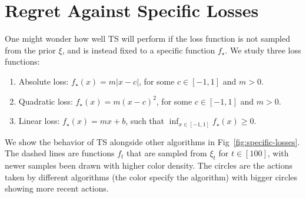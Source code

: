 \documentclass[letter, 12pt]{report}
\newcommand{\abs}[1]{\left| #1 \right|}
\newcommand{\1}{\mathbf{1}}
\newcommand{\ts}{\textsc{TS}\xspace}
\theoremstyle{plain}
\theoremstyle{definition}
\theoremstyle{remark}
\begin{document}
\section{Regret Against Specific Losses}
\label{sec:ts-empirical-results-regret}
One might wonder how well \ts will perform if the
loss function is not sampled from the prior $\xi$,
and is instead fixed to a specific function $f_\star$.
We study three loss functions:
\begin{enumerate}
    \item Absolute loss: $f_\star(x) = m\abs{x - c}$, for some $c \in [-1, 1]$ and $m > 0$.
    \item Quadratic loss: $f_\star(x) = m(x - c)^2$, for some $c \in [-1, 1]$ and $m > 0$.
    \item Linear loss: $f_\star(x) = mx + b$, such that $\inf_{x \in [-1, 1]} f_\star(x) \geq 0$.
\end{enumerate}
We show the behavior of \ts alongside other algorithms in Fig~\ref{fig:specific-losses}.
The dashed lines are functions $f_t$ that are sampled from
$\xi_t$ for $t \in [100]$, with newer samples been drawn
with higher color density.
The circles are the actions taken by different algorithms
(the color specify the algorithm) with bigger circles
showing more recent actions.
\end{document}
